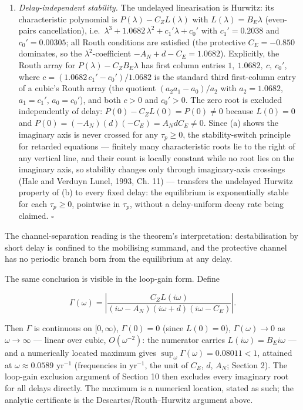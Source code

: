 \documentclass[11pt]{article}
\providecommand{\tightlist}{\setlength{\itemsep}{0pt}\setlength{\parskip}{0pt}}
\begin{document}
\begin{enumerate}
\def\labelenumi{(\alph{enumi})}
\setcounter{enumi}{1}
\tightlist
\item
  \emph{Delay-independent stability.} The undelayed linearisation is
  Hurwitz: its characteristic polynomial is
  \(P(\lambda) - C_Z L(\lambda)\) with \(L(\lambda) = B_E\lambda\)
  (even-pairs cancellation),
  i.e.~\(\lambda^3 + 1.0682\,\lambda^2 + c_1'\lambda + c_0'\) with
  \(c_1' = 0.2038\) and \(c_0' = 0.00305\); all Routh conditions are
  satisfied (the protective \(C_E = -0.850\) dominates, so the
  \(\lambda^2\)-coefficient \(-A_N + d - C_E = 1.0682\)). Explicitly,
  the Routh array for \(P(\lambda) - C_Z B_E\lambda\) has first column
  entries \(1,\ 1.0682,\ c,\ c_0'\), where
  \(c = (1.0682\,c_1' - c_0')/1.0682\) is the standard third
  first-column entry of a cubic's Routh array (the quotient
  \((a_2a_1 - a_0)/a_2\) with \(a_2 = 1.0682\), \(a_1 = c_1'\),
  \(a_0 = c_0'\)), and both \(c > 0\) and \(c_0' > 0\). The zero root is
  excluded independently of delay: \(P(0) - C_Z L(0) = P(0) \ne 0\)
  because \(L(0) = 0\) and \(P(0) = (-A_N)(d)(-C_E) = A_N d C_E \ne 0\).
  Since (a) shows the imaginary axis is never crossed for any
  \(\tau_p \ge 0\), the stability-switch principle for retarded
  equations --- finitely many characteristic roots lie to the right of
  any vertical line, and their count is locally constant while no root
  lies on the imaginary axis, so stability changes only through
  imaginary-axis crossings (Hale and Verduyn Lunel, 1993, Ch. 11) ---
  transfers the undelayed Hurwitz property of (b) to every fixed delay:
  the equilibrium is exponentially stable for each \(\tau_p \ge 0\),
  pointwise in \(\tau_p\), without a delay-uniform decay rate being
  claimed. \ensuremath{\square}
\end{enumerate}

The channel-separation reading is the theorem's interpretation:
destabilisation by short delay is confined to the mobilising summand,
and the protective channel has no periodic branch born from the
equilibrium at any delay.

The same conclusion is visible in the loop-gain form. Define

\[\Gamma(\omega) = \left| \frac{C_Z L(i\omega)}{(i\omega - A_N)(i\omega + d)(i\omega - C_E)} \right|.\]

Then \(\Gamma\) is continuous on \([0,\infty)\), \(\Gamma(0) = 0\)
(since \(L(0) = 0\)), \(\Gamma(\omega) \to 0\) as \(\omega \to \infty\)
--- linear over cubic, \(O(\omega^{-2})\): the numerator carries
\(L(i\omega) = B_E i\omega\) --- and a numerically located maximum gives
\(\sup_\omega \Gamma(\omega) = 0.08011 < 1\), attained at
\(\omega \approx 0.0589\) yr\(^{-1}\) (frequencies in yr\(^{-1}\), the
unit of \(C_E\), \(d\), \(A_N\); Section 2). The loop-gain exclusion
argument of Section 10 then excludes every imaginary root for all delays
directly. The maximum is a numerical location, stated as such; the
analytic certificate is the Descartes/Routh--Hurwitz argument above.
\end{document}

